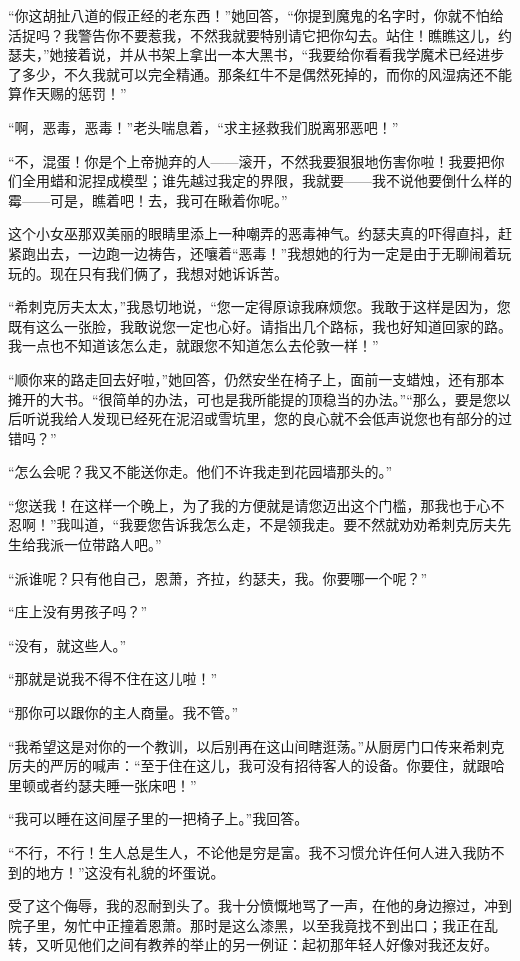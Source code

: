 \par “你这胡扯八道的假正经的老东西！”她回答，“你提到魔鬼的名字时，你就不怕给活捉吗？我警告你不要惹我，不然我就要特别请它把你勾去。站住！瞧瞧这儿，约瑟夫，”她接着说，并从书架上拿出一本大黑书，“我要给你看看我学魔术已经进步了多少，不久我就可以完全精通。那条红牛不是偶然死掉的，而你的风湿病还不能算作天赐的惩罚！”
\par “啊，恶毒，恶毒！”老头喘息着，“求主拯救我们脱离邪恶吧！”
\par “不，混蛋！你是个上帝抛弃的人——滚开，不然我要狠狠地伤害你啦！我要把你们全用蜡和泥捏成模型；谁先越过我定的界限，我就要——我不说他要倒什么样的霉——可是，瞧着吧！去，我可在瞅着你呢。”
\par 这个小女巫那双美丽的眼睛里添上一种嘲弄的恶毒神气。约瑟夫真的吓得直抖，赶紧跑出去，一边跑一边祷告，还嚷着“恶毒！”我想她的行为一定是由于无聊闹着玩玩的。现在只有我们俩了，我想对她诉诉苦。
\par “希刺克厉夫太太，”我恳切地说，“您一定得原谅我麻烦您。我敢于这样是因为，您既有这么一张脸，我敢说您一定也心好。请指出几个路标，我也好知道回家的路。我一点也不知道该怎么走，就跟您不知道怎么去伦敦一样！”
\par “顺你来的路走回去好啦，”她回答，仍然安坐在椅子上，面前一支蜡烛，还有那本摊开的大书。“很简单的办法，可也是我所能提的顶稳当的办法。”“那么，要是您以后听说我给人发现已经死在泥沼或雪坑里，您的良心就不会低声说您也有部分的过错吗？”
\par “怎么会呢？我又不能送你走。他们不许我走到花园墙那头的。”
\par “您送我！在这样一个晚上，为了我的方便就是请您迈出这个门槛，那我也于心不忍啊！”我叫道，“我要您告诉我怎么走，不是领我走。要不然就劝劝希刺克厉夫先生给我派一位带路人吧。”
\par “派谁呢？只有他自己，恩萧，齐拉，约瑟夫，我。你要哪一个呢？”
\par “庄上没有男孩子吗？”
\par “没有，就这些人。”
\par “那就是说我不得不住在这儿啦！”
\par “那你可以跟你的主人商量。我不管。”
\par “我希望这是对你的一个教训，以后别再在这山间瞎逛荡。”从厨房门口传来希刺克厉夫的严厉的喊声：“至于住在这儿，我可没有招待客人的设备。你要住，就跟哈里顿或者约瑟夫睡一张床吧！”
\par “我可以睡在这间屋子里的一把椅子上。”我回答。
\par “不行，不行！生人总是生人，不论他是穷是富。我不习惯允许任何人进入我防不到的地方！”这没有礼貌的坏蛋说。
\par 受了这个侮辱，我的忍耐到头了。我十分愤慨地骂了一声，在他的身边擦过，冲到院子里，匆忙中正撞着恩萧。那时是这么漆黑，以至我竟找不到出口；我正在乱转，又听见他们之间有教养的举止的另一例证：起初那年轻人好像对我还友好。
